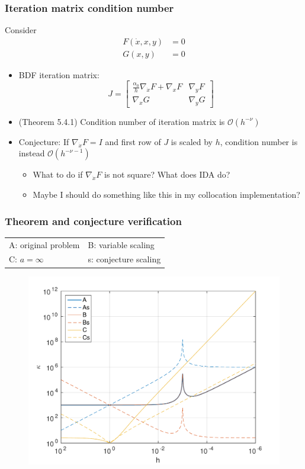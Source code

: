 \documentclass[]{beamer}
\begin{document}
\begin{frame}
\frametitle{Iteration matrix condition number}
Consider
\begin{align*}
F(\dot x, x, y) &= 0 \\
G(x, y) &= 0
\end{align*}
\begin{itemize}
\item
BDF iteration matrix:
\begin{equation}
J = \begin{bmatrix}
\frac{\alpha_0}{h} \nabla_{\dot x}F + \nabla_x F & \nabla_y F \\
\nabla_x G & \nabla_y G
\end{bmatrix}
\end{equation}
\item
(Theorem 5.4.1) Condition number of iteration matrix is $\mathcal{O}(h^{-\nu})$
\item
Conjecture: If $\nabla_{\dot x}F = I$ and first row of $J$ is scaled by $h$, condition number is instead $\mathcal{O}(h^{-\nu-1})$
\begin{itemize}
\item
What to do if $\nabla_{\dot x}F$ is not square? What does IDA do?
\item
Maybe I should do something like this in my collocation implementation?
\end{itemize}
\end{itemize}
\end{frame}

\begin{frame}
\frametitle{Theorem and conjecture verification}
\begin{table}
\centering
\begin{tabular}{ll}
A: original problem & B: variable scaling \\
C: $a = \infty$ & s: conjecture scaling
\end{tabular}
\end{table}
\begin{figure}[H]
	\centering
	\includegraphics[width=0.85\linewidth]{cond_test.pdf}
\end{figure}
\end{frame}
\end{document}
